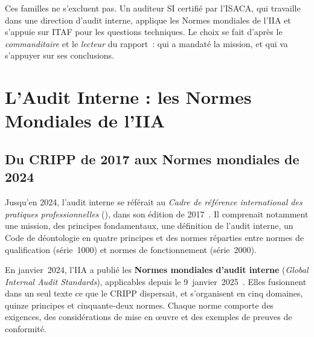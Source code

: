 Ces familles ne s'excluent pas. Un auditeur SI certifié par l'ISACA, qui
travaille dans une direction d'audit interne, applique les Normes mondiales
de l'IIA et s'appuie sur ITAF pour les questions techniques. Le choix se
fait d'après le \emph{commanditaire} et le \emph{lecteur} du rapport~: qui
a mandaté la mission, et qui va s'appuyer sur ses conclusions.

\section{L'Audit Interne : les Normes Mondiales de l'IIA}
\label{sec:c13-iia}

\subsection{Du CRIPP de 2017 aux Normes mondiales de 2024}

Jusqu'en 2024, l'audit interne se référait au \emph{Cadre de référence
international des pratiques professionnelles} (), dans son
édition de 2017~\cite{iia2017cripp}. Il comprenait notamment une mission,
des principes fondamentaux, une définition de l'audit interne, un Code de
déontologie en quatre principes et des normes réparties entre normes de
qualification (série~1000) et normes de fonctionnement (série~2000).

En janvier~2024, l'IIA a publié les \textbf{Normes mondiales d'audit
interne} (\textit{Global Internal Audit Standards}), applicables depuis
le 9~janvier~2025~\cite{iia2024gias}. Elles fusionnent dans un seul texte
ce que le CRIPP dispersait, et s'organisent en cinq domaines, quinze
principes et cinquante-deux normes. Chaque norme comporte des exigences,
des considérations de mise en œuvre et des exemples de preuves de
conformité.

